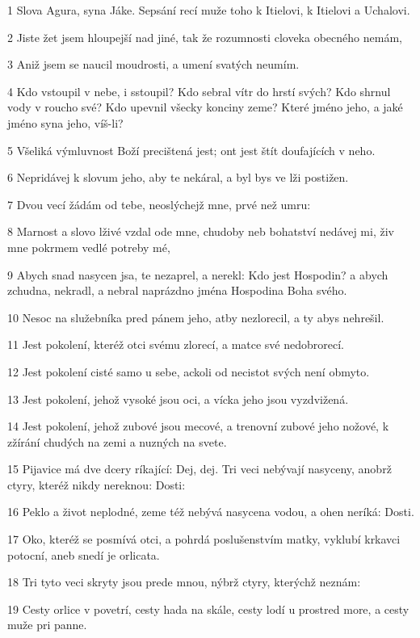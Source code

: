 \par 1 Slova Agura, syna Jáke. Sepsání recí muže toho k Itielovi, k Itielovi a Uchalovi.
\par 2 Jiste žet jsem hloupejší nad jiné, tak že rozumnosti cloveka obecného nemám,
\par 3 Aniž jsem se naucil moudrosti, a umení svatých neumím.
\par 4 Kdo vstoupil v nebe, i sstoupil? Kdo sebral vítr do hrstí svých? Kdo shrnul vody v roucho své? Kdo upevnil všecky konciny zeme? Které jméno jeho, a jaké jméno syna jeho, víš-li?
\par 5 Všeliká výmluvnost Boží precištená jest; ont jest štít doufajících v neho.
\par 6 Nepridávej k slovum jeho, aby te nekáral, a byl bys ve lži postižen.
\par 7 Dvou vecí žádám od tebe, neoslýchejž mne, prvé než umru:
\par 8 Marnost a slovo lživé vzdal ode mne, chudoby neb bohatství nedávej mi, živ mne pokrmem vedlé potreby mé,
\par 9 Abych snad nasycen jsa, te nezaprel, a nerekl: Kdo jest Hospodin? a abych zchudna, nekradl, a nebral naprázdno jména Hospodina Boha svého.
\par 10 Nesoc na služebníka pred pánem jeho, atby nezlorecil, a ty abys nehrešil.
\par 11 Jest pokolení, kteréž otci svému zlorecí, a matce své nedobrorecí.
\par 12 Jest pokolení cisté samo u sebe, ackoli od necistot svých není obmyto.
\par 13 Jest pokolení, jehož vysoké jsou oci, a vícka jeho jsou vyzdvižená.
\par 14 Jest pokolení, jehož zubové jsou mecové, a trenovní zubové jeho nožové, k zžírání chudých na zemi a nuzných na svete.
\par 15 Pijavice má dve dcery ríkající: Dej, dej. Tri veci nebývají nasyceny, anobrž ctyry, kteréž nikdy nereknou: Dosti:
\par 16 Peklo a život neplodné, zeme též nebývá nasycena vodou, a ohen neríká: Dosti.
\par 17 Oko, kteréž se posmívá otci, a pohrdá poslušenstvím matky, vyklubí krkavci potocní, aneb snedí je orlicata.
\par 18 Tri tyto veci skryty jsou prede mnou, nýbrž ctyry, kterýchž neznám:
\par 19 Cesty orlice v povetrí, cesty hada na skále, cesty lodí u prostred more, a cesty muže pri panne.
